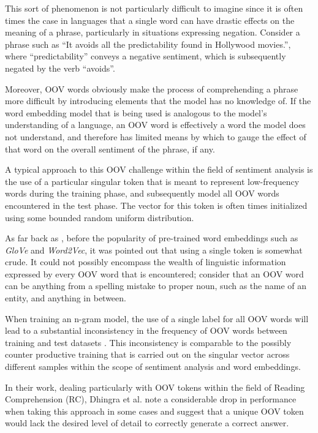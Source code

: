 \documentclass[../../fyp.tex]{subfiles}
\begin{document}
This sort of phenomenon is not particularly difficult to imagine since it is often times the case in languages that a single word can have drastic effects on the meaning of a phrase, particularly in situations expressing negation. Consider a phrase such as \enquote{It avoids all the predictability found in Hollywood movies.}, where \enquote{predictability} conveys a negative sentiment, which is subsequently negated by the verb \enquote{avoids}.

Moreover, OOV words obviously make the process of comprehending a phrase more difficult by introducing elements that the model has no knowledge of. If the word embedding model that is being used is analogous to the model's understanding of a language, an OOV word is effectively a word the model does not understand, and therefore has limited means by which to gauge the effect of that word on the overall sentiment of the phrase, if any.

A typical approach to this OOV challenge within the field of sentiment analysis is the use of a particular singular token that is meant to represent low-frequency words during the training phase, and subsequently model all OOV words encountered in the test phase. The vector for this token is often times initialized using some bounded random uniform distribution.

As far back as \cite{gallwitz1996}, before the popularity of pre-trained word embeddings such as \textit{GloVe} and \textit{Word2Vec}, it was pointed out that using a single token is somewhat crude. It could not possibly encompass the wealth of linguistic information expressed by every OOV word that is encountered; consider that an OOV word can be anything from a spelling mistake to proper noun, such as the name of an entity, and anything in between.

When training an n-gram model, the use of a single \unk label for all OOV words will lead to a substantial inconsistency in the frequency of OOV words between training and test datasets \cite{gallwitz1996}. This inconsistency is comparable to the possibly counter productive training that is carried out on the singular \unk vector across different samples within the scope of sentiment analysis and word embeddings.

In their work, dealing particularly with OOV tokens within the field of Reading Comprehension (RC), Dhingra et al. \cite{bhuwandhingra2017} note a considerable drop in performance when taking this approach in some cases and suggest that a unique OOV token would lack the desired level of detail to correctly generate a correct answer.
\end{document}
